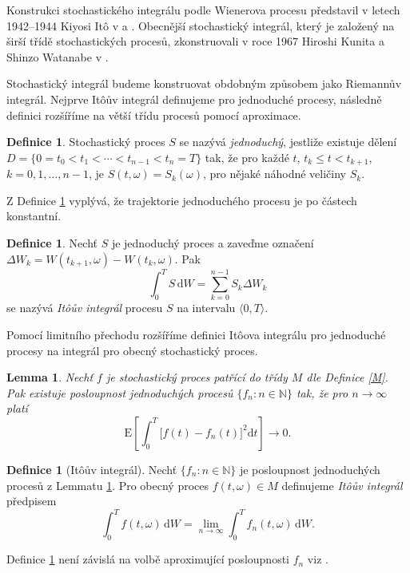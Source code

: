 \documentclass[a4paper,12pt]{report}
\newtheorem{lemma}[veta]{Lemma}
\theoremstyle{definition} \newtheorem{definice}[veta]{Definice}
\theoremstyle{remark}
\begin{document}
Konstrukci stochastického integrálu podle Wienerova procesu představil v letech 1942--1944 Kiyosi It\^o v \cite{ito1942differential} a \cite{ito1944}. 
Obecnější stochastický integrál, který je založený na širší třídě stochastických procesů, zkonstruovali v roce 1967 Hiroshi Kunita a Shinzo Watanabe v \cite{kunita1967square}.


Stochastický integrál budeme konstruovat obdobným způsobem jako Riemannův integrál.
Nejprve It\^oův integrál definujeme pro jednoduché procesy, následně definici rozšíříme na větší třídu procesů pomocí aproximace.

\begin{definice}\label{jednoduchafunkce}
Stochastický proces $S$ se nazývá \textit{jednoduchý}, %
jestliže existuje dělení $D=\{0=t_0<t_1<\cdots<t_{n-1}<t_n=T\}$ tak, že pro každé $t$, $t_k\le t<t_{k+1}$, $k=0,1,\dots,n-1$, je $S(t,\omega)=S_k(\omega)$, pro nějaké náhodné veličiny $S_k$. 
\end{definice}
Z Definice \ref{jednoduchafunkce} vyplývá, že trajektorie jednoduchého procesu je po částech konstantní. 

\begin{definice}
Nechť $S$ je jednoduchý proces a zaveďme označení \linebreak$\Delta W_k=W(t_{k+1},\omega)-W(t_k,\omega)$.
Pak
$$\int_0^TS\,\mathrm{d}W=\sum_{k=0}^{n-1}S_k\Delta W_k$$
se nazývá \textit{It\^oův integrál} procesu $S$ na intervalu $\langle 0,T\rangle$.
\end{definice}

Pomocí limitního přechodu rozšíříme definici It\^oova integrálu pro jednoduché procesy na integrál pro obecný stochastický proces.

\begin{lemma} \label{itoint}
Nechť $f$ je stochastický proces patřící do třídy $M$ dle Definice \ref{M}.
Pak existuje posloupnost jednoduchých procesů $\{f_n:n\in\mathbb N\}$ tak, že pro $n\to\infty$ platí
$$\mathrm{E}\left[\int_0^T\big[f(t)-f_n(t)\big]^2\mathrm{d}t\right]\longrightarrow0.$$
\end{lemma}

\begin{definice}[It\^oův integrál]\label{Ito_int}
Nechť $\{f_n:n\in\mathbb N\}$ je posloupnost jednoduchých procesů z Lemmatu \ref{itoint}.
Pro obecný proces $f(t,\omega)\in M$ definujeme \textit{It\^oův integrál} předpisem
$$\int_0^Tf(t,\omega)\,\mathrm{d}W=\lim_{n\to\infty}\int_0^Tf_n(t,\omega)\,\mathrm{d}W.$$
\end{definice}
Definice \ref{Ito_int} není závislá na volbě aproximující posloupnosti $f_n$ viz \cite{oksendal2003stochastic}.
\end{document}
